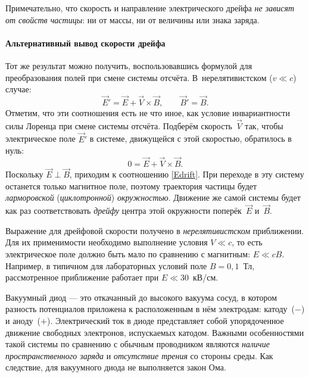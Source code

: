 
Примечательно, что скорость и направление электрического дрейфа
\emph{не зависят от свойств частицы}: ни от массы,
ни от величины или знака заряда.


\paragraph{Альтернативный вывод скорости дрейфа}
Тот же результат можно получить, воспользовавшись формулой для
преобразования полей при смене системы отсчёта. В~нерелятивистском
($v\ll c$) случае:
\[
\vec{E}' = \vec{E} + \vec{V}\times \vec{B},\qquad \vec{B}'=\vec{B}.
\]
Отметим, что эти соотношения есть не что иное, как условие инвариантности силы
Лоренца при смене системы отсчёта. Подберём скорость~$\vec{V}$ так, чтобы
электрическое поле $\vec{E}'$ в системе, движущейся с этой скоростью, обратилось
в нуль:
\[
 0 = \vec{E} + \vec{V}\times \vec{B}.
\]
Поскольку $\vec{E}\perp \vec{B}$, приходим к соотношению \eqref{Edrift}.
При переходе в эту систему останется только магнитное поле, поэтому
траектория частицы будет \emph{ларморовской} (\emph{циклотронной})
\emph{окружностью}. Движение же самой системы будет как раз соответствовать
\emph{дрейфу} центра этой окружности поперёк~$\vec{E}$ и~$\vec{B}$.

\begin{lab:note}
Выражение для дрейфовой скорости получено в \emph{нерелятивистском}
приближении. Для их применимости необходимо выполнение условия $V\ll c$,
то есть электрическое поле должно быть мало по сравнению с магнитным: $E\ll cB$.
Например, в типичном для лабораторных условий поле $B=0,1$~Тл, рассмотренное 
приближение работает при $E \ll  30$~кВ/см.
\end{lab:note}


\label{sec:vac_di}

Вакуумный диод --- это откачанный до высокого вакуума сосуд,
в котором разность потенциалов приложена к расположенным в нём электродам:
катоду~($-$) и аноду~($+$). Электрический ток в диоде представляет собой 
упорядоченное движение свободных электронов, испускаемых катодом.  
Важными особенностями такой системы по сравнению с обычным проводником 
являются \emph{наличие пространственного заряда}
и \emph{отсутствие трения} со стороны среды. Как следствие, для вакуумного диода 
не выполняется закон Ома.

